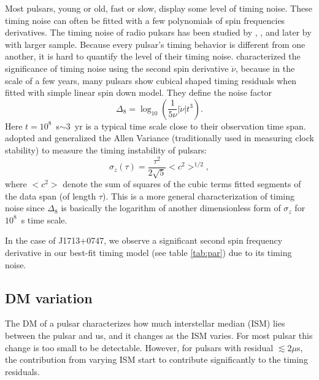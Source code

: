 Most pulsars, young or old, fast or slow, display some level of timing noise.
These timing noise can often be fitted with a few polynomials of spin frequencies derivatives.
The timing noise of radio pulsars has been studied by \citet{antt94},
\citet{dmhd95}, \citet{mtem97} and later by \citet{hlk10} with larger sample. 
Because every pulsar's timing behavior is different from one another, it is
hard to quantify the level of their timing noise.
\citet{antt94} characterized the significance of timing noise using the second
spin derivative $\ddot{\nu}$, because in the scale of a few years, many
pulsars show cubical shaped timing residuals when fitted with simple linear
spin down model.
They define the noise factor 
\begin{equation}
\label{eq:delta8}
\Delta_8 = \log_{10}\left(\frac{1}{5\nu}|\ddot{\nu}|t^3\right).
\end{equation}
Here $t=10^8$~s$\sim 3$~yr is a typical time scale close to their
observation time span.
\citet{mtem97} adopted and generalized the Allen Variance (traditionally used in measuring
clock stability) to measure the timing instability of pulsars:
\begin{equation}
\label{eq:sigmaz}
\sigma_z(\tau) = \frac{\tau^2}{2\sqrt{5}}<c^2>^{1/2},
\end{equation}
where $<c^2>$ denote the sum of squares of the cubic terms fitted segments of
the data span (of length $\tau$).
This is a more general characterization of timing noise since $\Delta_8$ is
basically the logarithm of another dimensionless form of $\sigma_z$ for
$10^8$~s time scale.



In the case of J1713+0747, we observe a significant second spin frequency derivative in our
best-fit timing model (see table \ref{tab:par}) due to its timing noise.



\subsection{DM variation}
\label{sec:dmx}
The DM of a pulsar characterizes how much interstellar median (ISM) lies
between the pulsar and us, and it changes as the ISM varies. For most pulsar
this change is too small to be detectable. However, for pulsars with residual
$\lesssim2\mu$s, the contribution from varying ISM start to contribute
significantly to the timing residuals. 

